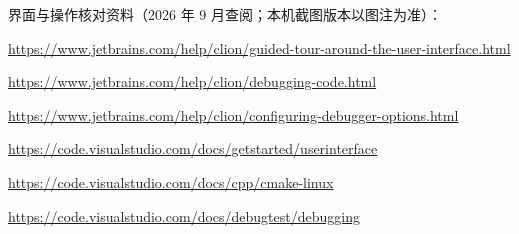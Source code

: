 \begin{note}
界面与操作核对资料（2026 年 9 月查阅；本机截图版本以图注为准）：
\par\footnotesize
\url{https://www.jetbrains.com/help/clion/guided-tour-around-the-user-interface.html}\par
\url{https://www.jetbrains.com/help/clion/debugging-code.html}\par
\url{https://www.jetbrains.com/help/clion/configuring-debugger-options.html}\par
\url{https://code.visualstudio.com/docs/getstarted/userinterface}\par
\url{https://code.visualstudio.com/docs/cpp/cmake-linux}\par
\url{https://code.visualstudio.com/docs/debugtest/debugging}
\end{note}
\endgroup

